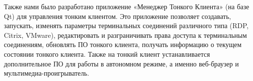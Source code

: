 \documentclass[10pt, a5paper]{article}
\begin{document}
Также нами было разработано приложение «Менеджер Тонкого Клиента» (на базе Qt) для управления тонким клиентом. Это приложение позволяет создавать, запускать, изменять параметры терминальных соединений различного типа (RDP, Citrix, VMware), редактировать и разграничивать права доступа к терминальным соединениям, обновлять ПО тонкого клиента, получать информацию о текущем состоянии тонкого клиента. Также на тонкий клиент устанавливается дополнительное ПО для работы в автономном режиме, а именно веб-браузер и мультимедиа-проигрыватель.
\end{document}
